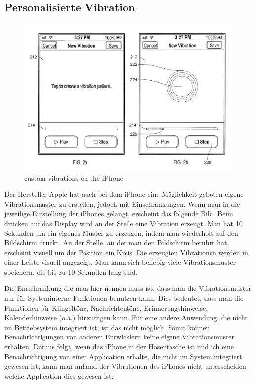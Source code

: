 \subsection{Personalisierte Vibration}
\label{ch:Grundlagen:sec:RelatedWork:subsec:PersonalisierteVibration}

\begin{figure}
	\centering
    \includegraphics[width=\textwidth]{pics/iphone.png}
    \caption{custom vibrations on the iPhone}
    \label{fig:iphone}
\end{figure}

Der Hersteller Apple hat auch bei dem iPhone eine M{\"o}glichkeit geboten eigene Vibrationsmuster zu erstellen, jedoch mit Einschr{\"a}nkungen.
Wenn man in die jeweilige Einstellung der iPhones gelangt, erscheint das folgende Bild. Beim dr{\"u}cken auf das Display wird an der Stelle eine Vibration erzeugt. Man hat 10 Sekunden um ein eigenes Muster zu erzeugen, indem man wiederholt auf den Bildschirm dr{\"u}ckt. An der Stelle, an der man den Bildschirm ber{\"u}hrt hat, erscheint visuell um der Position ein Kreis. Die erzeugten Vibrationen werden in einer Leiste visuell angezeigt. 
Man kann sich beliebig viele Vibrationsmuster speichern, die bis zu 10 Sekunden lang sind. \cite{fleizach2016custom}

Die Einschr{\"a}nkung die man hier nennen muss ist, dass man die Vibrationsmuster nur f{\"u}r Systeminterne Funktionen benutzen kann. Dies bedeutet, dass man die Funktionen f{\"u}r Klingelt{\"o}ne, Nachrichtent{\"o}ne, Erinnerungshinweise, Kalenderhinweise (o.{\"a}.) hinzuf{\"u}gen kann. F{\"u}r eine andere Anwendung, die nicht im Betriebsystem integriert ist, ist das nicht m{\"o}glich. Somit k{\"o}nnen Benachrichtigungen von anderen Entwicklern keine eigene Vibrationsmuster erhalten. Daraus folgt, wenn das iPhone in der Hosentasche ist und ich eine Benachrichtigung von einer Application erhalte, die nicht im System integriert gewesen ist, kann man anhand der Vibrationen des iPhones nicht unterscheiden welche Application dies gewesen ist.

